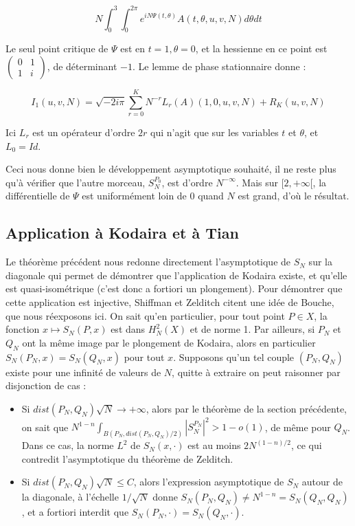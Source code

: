 \begin{preuve}
	\begin{equation*}
		N\int_0^3\int_0^{2\pi}e^{iN\Psi(t,\theta)}A(t,\theta, u,v,N)d\theta  dt
	\end{equation*}
	
	Le seul point critique de $\Psi$ est en $t=1, \theta=0$, et la hessienne en ce point est $\begin{pmatrix}
	0&1\\1&i
	\end{pmatrix}$, de déterminant $-1$. Le lemme de phase stationnaire donne :
	
	\begin{equation*}
	I_1(u,v,N) =\sqrt{-2i\pi}\sum_{r=0}^K N^{-r}L_r(A)(1,0,u,v,N) + R_K(u,v,N)
	\end{equation*}
	
	Ici $L_r$ est un opérateur d'ordre $2r$ qui n'agit que sur les variables $t$ et $\theta$, et $L_0=Id$. 
	
	Ceci nous donne bien le développement asymptotique souhaité, il ne reste plus qu'à vérifier que l'autre morceau, $S_N^{P_0}$, est d'ordre $N^{-\infty}$. Mais sur $[2,+\infty[$, la différentielle de $\Psi$ est uniformément loin de $0$ quand $N$ est grand, d'où le résultat.
	\end{preuve}
	
\subsection{Application à Kodaira et à Tian}
	Le théorème précédent nous redonne directement l'asymptotique de $S_N$ sur la diagonale qui permet de démontrer que l'application de Kodaira existe, et qu'elle est quasi-isométrique (c'est donc a fortiori un plongement). Pour démontrer que cette application est injective, Shiffman et Zelditch citent une idée de Bouche, que nous réexposons ici. On sait qu'en particulier, pour tout point $P \in X$, la fonction $x \mapsto S_N(P,x)$ est dans $H^2_N(X)$ et de norme 1. Par ailleurs, si $P_N$ et $Q_N$ ont la même image par le plongement de Kodaira, alors en particulier $S_N(P_N,x)=S_N(Q_N,x)$ pour tout $x$. Supposons qu'un tel couple $(P_N,Q_N)$ existe pour une infinité de valeurs de $N$, quitte à extraire on peut raisonner par disjonction de cas :
	
	\begin{itemize}
		\item Si $dist(P_N,Q_N)\sqrt{N} \to +\infty$, alors par le théorème de la section précédente, on sait que $N^{1-n}\int_{B(P_N,dist(P_N,Q_N)/2)}|S_N^{P_N}|^2 > 1-o(1)$, de même pour $Q_N$. Dans ce cas, la norme $L^2$ de $S_N(x,\cdot)$ est au moins $2N^{(1-n)/2}$, ce qui contredit l'asymptotique du théorème de Zelditch.
		\item Si $dist(P_N,Q_N)\sqrt{N} \leq C$, alors l'expression asymptotique de $S_N$ autour de la diagonale, à l'échelle $1/\sqrt{N}$ donne $S_N(P_N,Q_N)\neq N^{1-n}=S_N(Q_N,Q_N)$, et a fortiori interdit que $S_N(P_N,\cdot)=S_N(Q_N,\cdot)$.
	\end{itemize}

